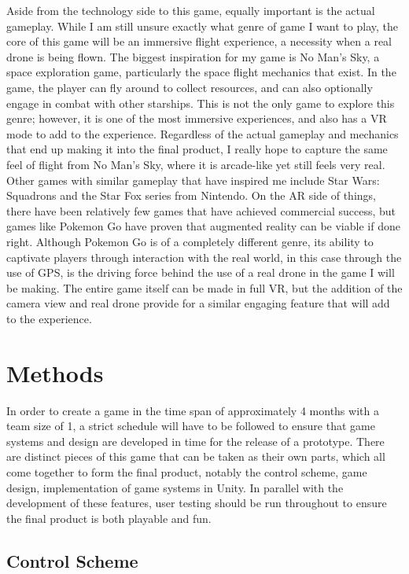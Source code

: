 \documentclass[10pt,twocolumn]{article}
\begin{document}
Aside from the technology side to this game, equally important is the actual gameplay. While I am still unsure exactly what genre of game I want to play, the core of this game will be an immersive flight experience, a necessity when a real drone is being flown. The biggest inspiration for my game is No Man's Sky, a space exploration game, particularly the space flight mechanics that exist. In the game, the player can fly around to collect resources, and can also optionally engage in combat with other starships. This is not the only game to explore this genre; however, it is one of the most immersive experiences, and also has a VR mode to add to the experience. Regardless of the actual gameplay and mechanics that end up making it into the final product, I really hope to capture the same feel of flight from No Man's Sky, where it is arcade-like yet still feels very real. Other games with similar gameplay that have inspired me include Star Wars: Squadrons and the Star Fox series from Nintendo. On the AR side of things, there have been relatively few games that have achieved commercial success, but games like Pokemon Go have proven that augmented reality can be viable if done right. Although Pokemon Go is of a completely different genre, its ability to captivate players through interaction with the real world, in this case through the use of GPS, is the driving force behind the use of a real drone in the game I will be making. The entire game itself can be made in full VR, but the addition of the camera view and real drone provide for a similar engaging feature that will add to the experience.

\section{Methods}

In order to create a game in the time span of approximately 4 months with a team size of 1, a strict schedule will have to be followed to ensure that game systems and design are developed in time for the release of a prototype. There are distinct pieces of this game that can be taken as their own parts, which all come together to form the final product, notably the control scheme, game design, implementation of game systems in Unity. In parallel with the development of these features, user testing should be run throughout to ensure the final product is both playable and fun.

\subsection{Control Scheme}
\end{document}
